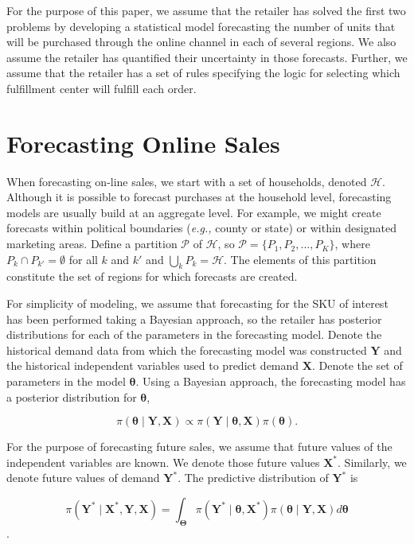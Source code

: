 \documentclass[11pt, oneside]{article}   	%
\begin{document}
For the purpose of this paper, we assume that the retailer has solved the first two problems by developing a statistical model forecasting the number of units that will be purchased through the online channel in each of several regions.  We also assume the retailer has quantified their uncertainty in those forecasts.  Further, we assume that the retailer has a set of rules specifying the logic for selecting which fulfillment center will fulfill each order.

\section{Forecasting Online Sales}

When forecasting on-line sales, we start with a set of households, denoted $\mathcal{H}$.  Although it is possible to forecast purchases at the household level, forecasting models are usually build at an aggregate level.  For example, we might create forecasts within political boundaries (\emph{e.g.,} county or state) or within designated marketing areas.  Define a partition $\mathcal{P}$ of $\mathcal{H}$, so $\mathcal{P} = \{P_1, P_2, ..., P_K \}$, where $P_k \cap P_{k'} = \emptyset$ for all $k$ and $k'$ and $\bigcup_k P_k = \mathcal{H}$.  The elements of this partition constitute the set of regions for which forecasts are created.

For simplicity of modeling, we assume that forecasting for the SKU of interest has been performed taking a Bayesian approach, so the retailer has posterior distributions for each of the parameters in the forecasting model.  Denote the historical demand data from which the forecasting model was constructed $\mathbf{Y}$ and the historical independent variables used to predict demand $\mathbf{X}$.  Denote the set of parameters in the model $\boldsymbol{\theta}$.  Using a Bayesian approach, the forecasting model has a posterior distribution for $\boldsymbol{\theta}$,

$$\pi (\boldsymbol{\theta} \mid \mathbf{Y}, \mathbf{X}) \propto \pi (\mathbf{Y} \mid \boldsymbol{\theta}, \mathbf{X}) \pi (\boldsymbol{\theta}).$$

\noindent For the purpose of forecasting future sales, we assume that future values of the independent variables are known.  We denote those future values $\mathbf{X}^*$.  Similarly, we denote future values of demand $\mathbf{Y}^*$.  The predictive distribution of $\mathbf{Y}^*$ is

$$\pi (\mathbf{Y}^* \mid \mathbf{X}^*, \mathbf{Y}, \mathbf{X}) = \int_{\boldsymbol{\Theta}} \pi (\mathbf{Y}^* \mid \boldsymbol{\theta}, \mathbf{X}^*) \pi (\boldsymbol{\theta} \mid \mathbf{Y}, \mathbf{X}) d \boldsymbol{\theta}$$.
\end{document}
